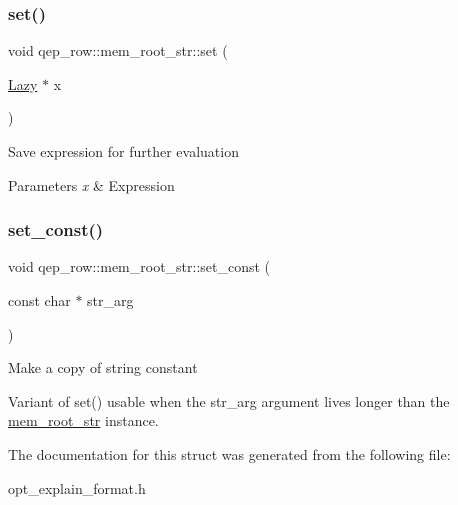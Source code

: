 \subsubsection{\texorpdfstring{set()}{set()}\hspace{0.1cm}{\footnotesize\ttfamily [2/2]}}
{\footnotesize\ttfamily void qep\+\_\+row\+::mem\+\_\+root\+\_\+str\+::set (\begin{DoxyParamCaption}\item[{\mbox{\hyperlink{classLazy}{Lazy}} $\ast$}]{x }\end{DoxyParamCaption})\hspace{0.3cm}{\ttfamily [inline]}}

Save expression for further evaluation


\begin{DoxyParams}{Parameters}
{\em x} & Expression \\
\hline
\end{DoxyParams}
\mbox{\label{structqep__row_1_1mem__root__str_a6352c7d8d3e2e5e79104d05258511035}} 
\subsubsection{\texorpdfstring{set\+\_\+const()}{set\_const()}}
{\footnotesize\ttfamily void qep\+\_\+row\+::mem\+\_\+root\+\_\+str\+::set\+\_\+const (\begin{DoxyParamCaption}\item[{const char $\ast$}]{str\+\_\+arg }\end{DoxyParamCaption})\hspace{0.3cm}{\ttfamily [inline]}}

Make a copy of string constant

Variant of set() usable when the str\+\_\+arg argument lives longer than the \mbox{\hyperlink{structqep__row_1_1mem__root__str}{mem\+\_\+root\+\_\+str}} instance. 

The documentation for this struct was generated from the following file\+:\begin{DoxyCompactItemize}
\item 
opt\+\_\+explain\+\_\+format.\+h\end{DoxyCompactItemize}
